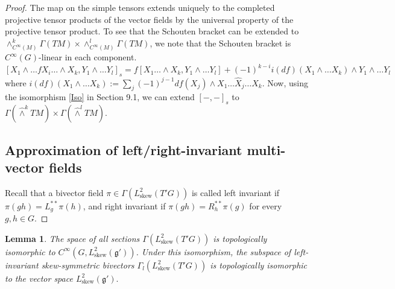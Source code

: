 \documentclass[11pt,reqno]{amsart}
\newtheorem{lemma}[theorem]{Lemma}
\theoremstyle{definition}
\numberwithin{equation}{section}
\begin{document}
\begin{proof}
The map on the simple tensors extends uniquely to the completed projective tensor products of the vector fields by the universal property of the projective tensor product. To see that the Schouten bracket can be extended to $\wedge^k_{C^{\infty}(M)}\Gamma(TM) \times \wedge^l_{C^{\infty}(M)}\Gamma(TM)$, we note that the Schouten bracket is $C^{\infty}(G)$-linear in each component.
\[
[X_1 \wedge \dots f X_i \dots \wedge X_k, Y_1 \wedge \dots Y_l]_s = f[X_1 \dots \wedge X_k, Y_1 \wedge \dots Y_l] + (-1)^{k-i} i(df)(X_1 \wedge \dots X_k) \wedge Y_1 \wedge \dots Y_l
\]
where $i(df)(X_1 \wedge \dots X_k) := \sum_j (-1)^{j-1} df(X_j) \wedge X_1 \dots \hat{X}_j \dots X_k$. Now, using the isomorphism \ref{Iso} in Section 9.1, we can extend $[-,-]_s$ to $\Gamma(\hat\wedge^k TM) \times \Gamma(\hat\wedge^l TM)$.
\subsection{Approximation of left/right-invariant multi-vector fields}
Recall that a bivector field $\pi \in \Gamma(L^2_{\text{skew}}(T'G))$ is called left invariant if $\pi(gh) = L_g^{**}\pi(h)$, and right invariant if $\pi(gh) = R_h^{**}\pi(g)$ for every $g, h \in G$.
\end{proof}

\begin{lemma}\label{8.8}
The space of all sections $\Gamma(L^2_{\text{skew}}(T'G))$ is topologically isomorphic to $C^{\infty}(G, L^2_{\text{skew}}(\mathfrak{g}'))$. Under this isomorphism, the subspace of left-invariant skew-symmetric bivectors $\Gamma_l(L^2_{\text{skew}}(T'G))$ is topologically isomorphic to the vector space $L^2_{\text{skew}}(\mathfrak{g}').$
\end{lemma}
\end{document}

